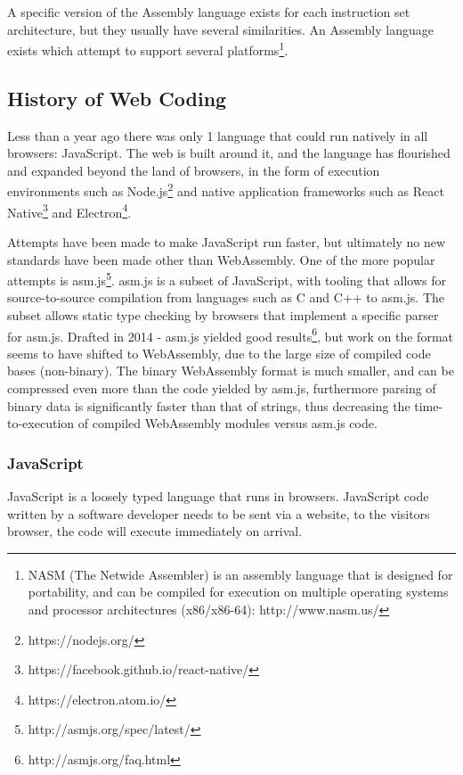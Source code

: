 \documentclass[a4paper]{article}
\begin{document}
A specific version of the Assembly language exists for each instruction set architecture, but they usually have several similarities. An Assembly language exists which attempt to support several platforms\footnote{NASM (The Netwide Assembler) is an assembly language that is designed for portability, and can be compiled for execution on multiple operating systems and processor architectures (x86/x86-64): http://www.nasm.us/}.

\newpage
\subsection{History of Web Coding}
\label{sec:problem-analysis:history}
Less than a year ago there was only 1 language that could run natively in all browsers: JavaScript. The web is built around it, and the language has flourished and expanded beyond the land of browsers, in the form of execution environments such as Node.js\footnote{https://nodejs.org/} and native application frameworks such as React Native\footnote{https://facebook.github.io/react-native/} and Electron\footnote{https://electron.atom.io/}.

Attempts have been made to make JavaScript run faster, but ultimately no new standards have been made other than WebAssembly. One of the more popular attempts is asm.js\footnote{http://asmjs.org/spec/latest/}. asm.js is a subset of JavaScript, with tooling that allows for source-to-source compilation from languages such as C and C++ to asm.js. The subset allows static type checking by browsers that implement a specific parser for asm.js. Drafted in 2014 - asm.js yielded good results\footnote{http://asmjs.org/faq.html}, but work on the format seems to have shifted to WebAssembly, due to the large size of compiled code bases (non-binary). The binary WebAssembly format is much smaller, and can be compressed even more than the code yielded by asm.js, furthermore parsing of binary data is significantly faster than that of strings, thus decreasing the time-to-execution of compiled WebAssembly modules versus asm.js code.

\subsubsection{JavaScript}
JavaScript is a loosely typed language that runs in browsers. JavaScript code written by a software developer needs to be sent via a website, to the visitors browser, the code will execute immediately on arrival.
\end{document}
